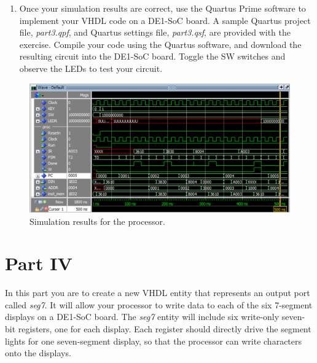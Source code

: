 \documentclass[epsfig,10pt,fullpage]{article}
\begin{document}
\begin{enumerate}
\begin{figure}[H]
\begin{center}
\begin{minipage}[h]{12.5 cm}
\begin{lstlisting}[name=proc]
// Read SW switches and display on LEDs
			mvt	r3, #LED_ADDRESS	// point to LED port
			mvt	r4, #SW_ADDRESS	// point to SW port
MAIN:		ld		r0, [r4]				// read SW values
			st		r0, [r3]				// light up LEDs
			mv 	pc, #MAIN
\end{lstlisting}
\end{minipage}
\caption{Assembly-language program that uses {\it ld} and {\it st} instructions.}
\label{fig:assembly}
\end{center}
\end{figure}

An example result produced by using {\it ModelSim} for a correctly-designed circuit 
is given in Figure~\ref{fig:part3}. It shows the execution of the first four instructions
in Figure~\ref{fig:assembly}.

\item Once your simulation results are correct, use the Quartus Prime software to implement your
VHDL code on a DE1-SoC board. A sample Quartus project file, {\it part3.qpf}, and Quartus
settings file, {\it part3.qsf}, are provided with the exercise. Compile your code using the 
Quartus software, and download the resulting circuit 
into the DE1-SoC board. Toggle the SW switches and observe the LEDs to test your circuit.
\end{enumerate}

\begin{figure}[H]
	\begin{center}
		\includegraphics[width=\textwidth]{figures/part3.png}
	\end{center}
	\caption{Simulation results for the processor.}
	\label{fig:part3}
\end{figure}

\section*{Part IV}
In this part you are to create a new VHDL entity that represents an output port called 
{\it seg7}. It will allow your processor to write data to each of the six 7-segment displays on a 
DE1-SoC board. The {\it seg7} entity will include six write-only seven-bit registers,
one for each display. Each register should directly drive the segment lights for one 
seven-segment display, so that the processor can write characters onto the displays. 
\end{document}
